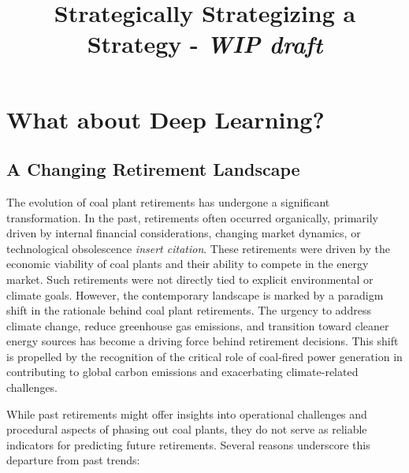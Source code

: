 \documentclass{article}
\title{Strategically Strategizing a Strategy - \textit{WIP draft}}
\date{}
\begin{document}
\maketitle






\section{What about Deep Learning?}

\subsection{A Changing Retirement Landscape}

The evolution of coal plant retirements has undergone a significant transformation. In the past, retirements often occurred organically, primarily driven by internal financial considerations, changing market dynamics, or technological obsolescence \textit{insert citation}. These retirements were driven by the economic viability of coal plants and their ability to compete in the energy market. Such retirements were not directly tied to explicit environmental or climate goals. However, the contemporary landscape is marked by a paradigm shift in the rationale behind coal plant retirements. The urgency to address climate change, reduce greenhouse gas emissions, and transition toward cleaner energy sources has become a driving force behind retirement decisions. This shift is propelled by the recognition of the critical role of coal-fired power generation in contributing to global carbon emissions and exacerbating climate-related challenges.

While past retirements might offer insights into operational challenges and procedural aspects of phasing out coal plants, they do not serve as reliable indicators for predicting future retirements. Several reasons underscore this departure from past trends:
\end{document}
